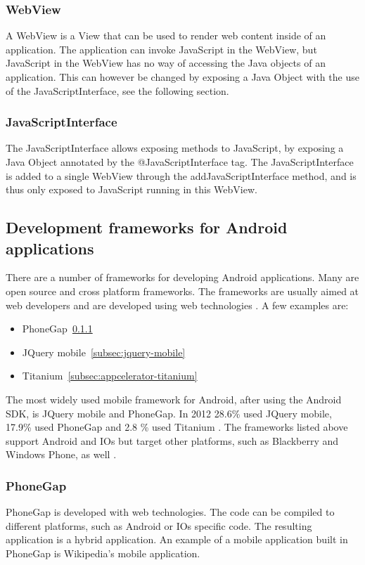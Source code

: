 \subsubsection{WebView}\label{subsubsec:webview}
A WebView \cite{webview2015} is a View \cite{view2015} that can be used to render web content inside of an application. The application can invoke JavaScript in the WebView, but JavaScript in the WebView has no way of accessing the Java objects of an application. This can however be changed by exposing a Java Object with the use of the JavaScriptInterface, see the following section.

\subsubsection{JavaScriptInterface}\label{subsubsec:javascriptinterface}
The JavaScriptInterface \cite{jsi2015} allows exposing methods to JavaScript, by exposing a Java Object annotated by the @JavaScriptInterface tag. The JavaScriptInterface is added to a single WebView through the addJavaScriptInterface method, and is thus only exposed to JavaScript running in this WebView.

\subsection{Development frameworks for Android applications}\label{subsec:development-frameworks-for-android-applications}
There are a number of frameworks for developing Android applications. Many are open source and cross platform frameworks. The frameworks are usually aimed at web developers and are developed using web technologies \cite{mondal2013}. A few examples are:

\begin{itemize}
\item PhoneGap~\ref{subsec:phonegap}
\item JQuery mobile~\ref{subsec:jquery-mobile}
\item Titanium~\ref{subsec:appcelerator-titanium}
\end{itemize}

The most widely used mobile framework for Android, after using the Android SDK, is JQuery mobile and PhoneGap. In 2012 28.6\% used JQuery mobile, 17.9\% used PhoneGap and 2.8 \% used Titanium \cite{eclipse2012}. The frameworks listed above support Android and IOs but target other platforms, such as Blackberry and Windows Phone, as well \cite{mondal2013}. 

\subsubsection{PhoneGap} \label{subsec:phonegap}
PhoneGap is developed with web technologies. The code can be compiled to different platforms, such as Android or IOs specific code. The resulting application is a hybrid application. An example of a mobile application built in PhoneGap is Wikipedia's mobile application.


